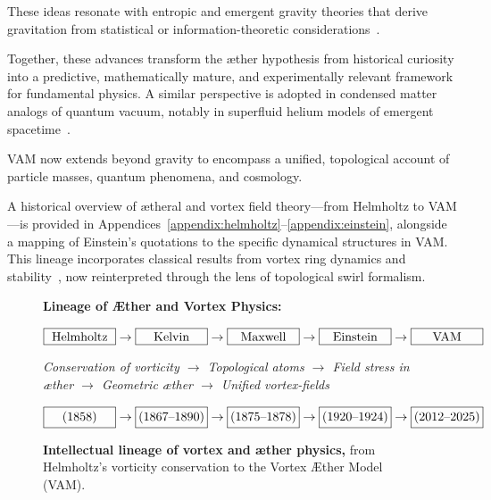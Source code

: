 These ideas resonate with entropic and emergent gravity theories that derive gravitation from statistical or information-theoretic considerations~\cite{Verlinde2011}.

Together, these advances transform the æther hypothesis from historical curiosity into a predictive, mathematically mature, and experimentally relevant framework for fundamental physics. A similar perspective is adopted in condensed matter analogs of quantum vacuum, notably in superfluid helium models of emergent spacetime~\cite{volovik2003universe}.


VAM now extends beyond gravity to encompass a unified, topological account of particle masses, quantum phenomena, and cosmology.

A historical overview of ætheral and vortex field theory—from Helmholtz to VAM—is provided in Appendices~\ref{appendix:helmholtz}–\ref{appendix:einstein}, alongside a mapping of Einstein’s quotations to the specific dynamical structures in VAM. This lineage incorporates classical results from vortex ring dynamics and stability~\cite{morris1977vortex}, now reinterpreted through the lens of topological swirl formalism.


\begin{figure}[htbp]
    \centering
    \noindent\textbf{Lineage of Æther and Vortex Physics:}

    \vspace{0.5em}
    {\small
        \[
            \fbox{\makebox[1.8cm][c]{Helmholtz}} \rightarrow
            \fbox{\makebox[1.8cm][c]{Kelvin}} \rightarrow
            \fbox{\makebox[1.8cm][c]{Maxwell}} \rightarrow
            \fbox{\makebox[1.8cm][c]{Einstein}} \rightarrow
            \fbox{\makebox[1.8cm][c]{VAM}}
        \]
    }

    \vspace{0.3em}
    {\scriptsize
    \textit{
        Conservation of vorticity $\rightarrow$ Topological atoms $\rightarrow$ Field stress in æther $\rightarrow$ Geometric æther $\rightarrow$ Unified vortex-fields}
    }

    \vspace{0.4em}
    {\small
        \[
            \fbox{\makebox[1.8cm][c]{(1858)}} \rightarrow
            \fbox{\makebox[1.8cm][c]{(1867--1890)}} \rightarrow
            \fbox{\makebox[1.8cm][c]{(1875--1878)}} \rightarrow
            \fbox{\makebox[1.8cm][c]{(1920--1924)}} \rightarrow
            \fbox{\makebox[1.8cm][c]{(2012--2025)}}
        \]
    }

    \caption{\textbf{Intellectual lineage of vortex and æther physics,} from Helmholtz’s vorticity conservation to the Vortex Æther Model (VAM).}
    \label{fig:lineage-aether-vortex}
\end{figure}
